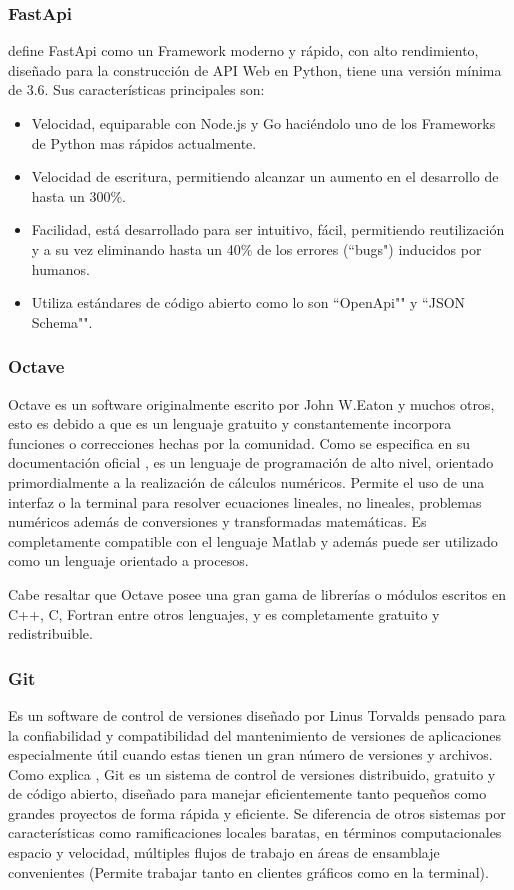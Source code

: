 \subsubsection{FastApi}
\textcite{FastApi} define FastApi como un Framework moderno y rápido, con alto
rendimiento, diseñado para
la construcción de API Web en Python, tiene una versión mínima de 3.6. Sus
características principales son:

\begin{itemize}
    \item Velocidad, equiparable con Node.js y Go haciéndolo
uno de los Frameworks de Python mas rápidos actualmente.
    \item Velocidad de escritura, permitiendo alcanzar un aumento en el desarrollo
        de hasta un 300\%.
    \item Facilidad, está desarrollado para ser intuitivo, fácil, permitiendo
        reutilización y a su vez eliminando hasta un 40\% de los errores (``bugs")
        inducidos por humanos.
    \item Utiliza estándares de código abierto como lo son ``OpenApi"" y ``JSON Schema"".
\end{itemize}

\subsubsection{Octave}
Octave es un software originalmente escrito por John W.Eaton y muchos otros,
esto es debido a que es un lenguaje gratuito y constantemente incorpora
funciones o correcciones hechas por la comunidad. Como se especifica en su
documentación oficial \textcite{octave}, es un lenguaje de programación de alto
nivel, orientado primordialmente a la realización de cálculos numéricos.
Permite el uso de una interfaz  o la terminal para resolver ecuaciones
lineales, no lineales, problemas numéricos además de conversiones y
transformadas matemáticas. Es completamente compatible con el lenguaje Matlab y
además puede ser utilizado como un lenguaje orientado a procesos.

Cabe resaltar que Octave posee una gran gama de librerías o módulos escritos en
C++, C, Fortran entre otros lenguajes, y es completamente gratuito y
redistribuible.


\subsubsection{Git}
Es un software de control de versiones diseñado por Linus Torvalds pensado para
la confiabilidad y compatibilidad del mantenimiento de versiones de aplicaciones
especialmente útil cuando estas tienen un gran número de versiones y archivos.
Como explica \textcite{Git}, Git es un sistema de control de versiones distribuido,
gratuito y de código abierto, diseñado para manejar eficientemente tanto pequeños
como grandes proyectos de forma rápida y eficiente. Se diferencia de otros sistemas
por características como ramificaciones locales baratas, en términos computacionales
espacio y velocidad, múltiples flujos de trabajo en áreas de ensamblaje convenientes
(Permite trabajar tanto en clientes gráficos como en la terminal).

